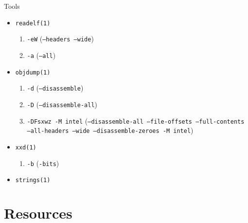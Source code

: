 \documentclass{beamer}
\begin{document}
\begin{frame}{Tools}
	\begin{itemize}
		\item \texttt{readelf(1)}

		\begin{enumerate}
			\item \texttt{-eW} (\texttt{--headers --wide})

			\item \texttt{-a} (\texttt{--all})
		\end{enumerate}

		\item \texttt{objdump(1)}

		\begin{enumerate}
			\item \texttt{-d} (\texttt{--disassemble})

			\item \texttt{-D} (\texttt{--disassemble-all})

			\item \texttt{-DFsxwz -M intel}
			(\texttt{--disassemble-all --file-offsets
			--full-contents --all-headers --wide
			--disassemble-zeroes -M intel})
		\end{enumerate}

		\item \texttt{xxd(1)}

		\begin{enumerate}
			\item \texttt{-b} (\texttt{-bits})
		\end{enumerate}

		\item \texttt{strings(1)}
	\end{itemize}
\end{frame}

\section{Resources}
\end{document}

